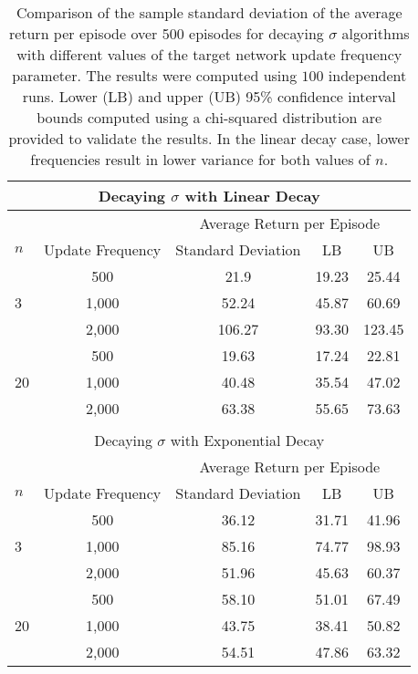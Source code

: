 \begin{table}[t] 
\caption[Comparison of the Sample Standard Deviation of the Average Return per Episode Over 500 Episodes for Decaying $\sigma$ Algorithms with Different Values of the Target Network Update Frequency Parameter]{Comparison of the sample standard deviation of the average return per episode over 500 episodes for decaying $\sigma$ algorithms with different values of the target network update frequency parameter.
The results were computed using $100$ independent runs.
Lower (LB) and upper (UB) 95\% confidence interval bounds computed using a chi-squared distribution are provided to validate the results.
In the linear decay case, lower frequencies result in lower variance for both values of $n$.
}
\label{tbl:variance_analysis}
\begin{center}
\begin{tabular}{lcccc}
\toprule
\multicolumn{5}{c}{Decaying $\sigma$ with Linear Decay} \\
\bottomrule
&& \multicolumn{3}{c}{Average Return per Episode} \\
\cmidrule{3-5}
$n$ & Update Frequency & Standard Deviation & LB & UB \\
\midrule
    & 500       & 21.9      & 19.23     & 25.44     \\
3   & 1,000     & 52.24     & 45.87     & 60.69     \\
    & 2,000     & 106.27    & 93.30     & 123.45    \\ 
\hdashline[3pt/3pt]
    & 500       & 19.63     & 17.24     & 22.81 \\
20  & 1,000     & 40.48     & 35.54     & 47.02 \\
    & 2,000     & 63.38     & 55.65     & 73.63 \\
\bottomrule
&&& \\
\toprule
\multicolumn{5}{c}{Decaying $\sigma$ with Exponential Decay} \\
\bottomrule
&& \multicolumn{3}{c}{Average Return per Episode} \\
\cmidrule{3-5}
$n$ & Update Frequency & Standard Deviation & LB & UB \\
\midrule
    & 500       & 36.12     & 31.71     & 41.96     \\
3   & 1,000     & 85.16     & 74.77     & 98.93     \\
    & 2,000     & 51.96     & 45.63     & 60.37     \\ 
\hdashline[3pt/3pt]
    & 500       & 58.10     & 51.01     & 67.49     \\
20  & 1,000     & 43.75     & 38.41     & 50.82     \\
    & 2,000     & 54.51     & 47.86     & 63.32     \\
\bottomrule
\end{tabular}
\end{center}
\end{table}


